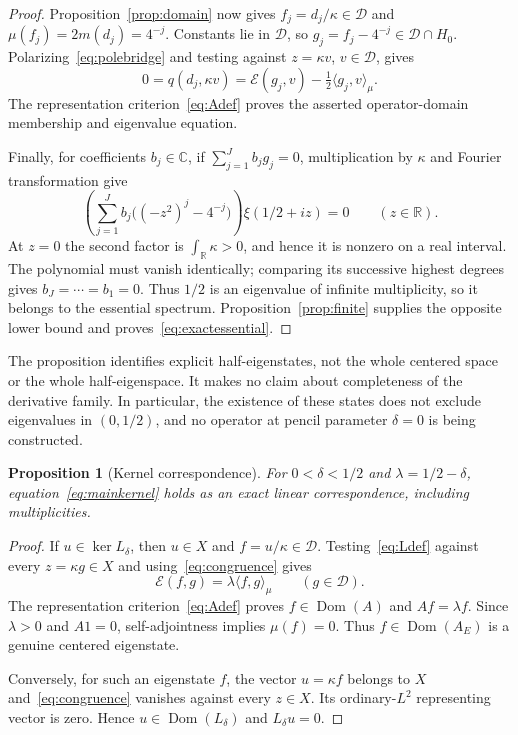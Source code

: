 \documentclass[11pt,a4paper]{article}
\numberwithin{equation}{section}
\newtheorem{proposition}[theorem]{Proposition}
\theoremstyle{remark}
\newcommand{\R}{\mathbb R}
\newcommand{\C}{\mathbb C}
\newcommand{\E}{\mathcal E}
\newcommand{\D}{\mathcal D}
\newcommand{\dom}{\operatorname{Dom}}
\newcommand{\ip}[2]{\langle #1,#2\rangle}
\begin{document}
\begin{proof}
Proposition~\ref{prop:domain} now gives $f_j=d_j/\kappa\in\D$ and $\mu(f_j)=2m(d_j)=4^{-j}$. Constants lie in $\D$, so $g_j=f_j-4^{-j}\in\D\cap H_0$. Polarizing~\eqref{eq:polebridge} and testing against $z=\kappa v$, $v\in\D$, gives
\[
 0=q(d_j,\kappa v)
   =\E(g_j,v)-\tfrac12\ip{g_j}{v}_\mu.
\]
The representation criterion~\eqref{eq:Adef} proves the asserted operator-domain membership and eigenvalue equation.

Finally, for coefficients $b_j\in\C$, if $\sum_{j=1}^Jb_jg_j=0$, multiplication by $\kappa$ and Fourier transformation give
\[
 \left(\sum_{j=1}^Jb_j\bigl((-z^2)^j-4^{-j}\bigr)\right)
       \xi(1/2+iz)=0\qquad(z\in\R).
\]
At $z=0$ the second factor is $\int_\R\kappa>0$, and hence it is nonzero on a real interval. The polynomial must vanish identically; comparing its successive highest degrees gives $b_J=\cdots=b_1=0$. Thus $1/2$ is an eigenvalue of infinite multiplicity, so it belongs to the essential spectrum. Proposition~\ref{prop:finite} supplies the opposite lower bound and proves~\eqref{eq:exactessential}.
\end{proof}

The proposition identifies explicit half-eigenstates, not the whole centered space or the whole half-eigenspace. It makes no claim about completeness of the derivative family. In particular, the existence of these states does not exclude eigenvalues in $(0,1/2)$, and no operator at pencil parameter $\delta=0$ is being constructed.

\begin{proposition}[Kernel correspondence]\label{prop:kernel}
For $0<\delta<1/2$ and $\lambda=1/2-\delta$, equation~\eqref{eq:mainkernel} holds as an exact linear correspondence, including multiplicities.
\end{proposition}
\begin{proof}
If $u\in\ker L_\delta$, then $u\in X$ and $f=u/\kappa\in\D$. Testing~\eqref{eq:Ldef} against every $z=\kappa g\in X$ and using~\eqref{eq:congruence} gives
\[
 \E(f,g)=\lambda\ip{f}{g}_\mu\qquad(g\in\D).
\]
The representation criterion~\eqref{eq:Adef} proves $f\in\dom(A)$ and $Af=\lambda f$. Since $\lambda>0$ and $A1=0$, self-adjointness implies $\mu(f)=0$. Thus $f\in\dom(A_E)$ is a genuine centered eigenstate.

Conversely, for such an eigenstate $f$, the vector $u=\kappa f$ belongs to $X$ and~\eqref{eq:congruence} vanishes against every $z\in X$. Its ordinary-$L^2$ representing vector is zero. Hence $u\in\dom(L_\delta)$ and $L_\delta u=0$.
\end{proof}
\end{document}
